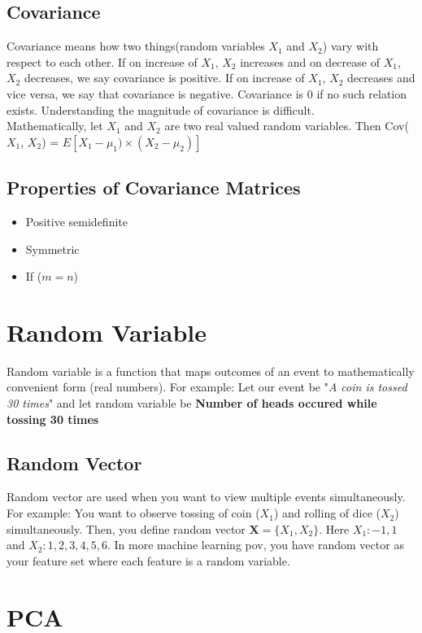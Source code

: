\documentclass[12pt]{article}
\begin{document}
		\subsection{Covariance}
			Covariance means how two things(random variables $X_1$ and $X_2$) vary with respect to each other. If on increase of $X_1$, $X_2$ increases and on decrease of $X_1$, $X_2$ decreases, we say covariance is positive. If on increase of $X_1$, $X_2$ decreases and vice versa, we say that covariance is negative. Covariance is 0 if no such relation exists. Understanding the magnitude of covariance is difficult. 
			\\
			Mathematically, let $X_1$ and $X_2$ are two real valued random variables. Then Cov($X_1$, $X_2$) = $E[X_1 - \mu_1)\times(X_2-\mu_2)]$
		
		
		\subsection{Properties of Covariance Matrices}
			\begin{itemize}
				\item Positive semidefinite
				\item Symmetric
				\item If ($m = n$)
			\end{itemize}


	\section{Random Variable}
		Random variable is a function that maps outcomes of an event to mathematically convenient form (real numbers). For example: Let our event be "\textit{A coin is tossed 30 times}" and let random variable be \textbf{Number of heads occured while tossing 30 times}
		
		\subsection{Random Vector}
			Random vector are used when you want to view multiple events simultaneously. For example: You want to observe tossing of coin ($X_1$) and rolling of dice ($X_2$) simultaneously. Then, you define random vector $\textbf{X} = \{X_1, X_2\}$. Here $X_1: {-1,1}$ and $X_2: {1,2,3,4,5,6}$. In more machine learning pov, you have random vector as your feature set where each feature is a random variable.

	\section{PCA}
	
\end{document}
